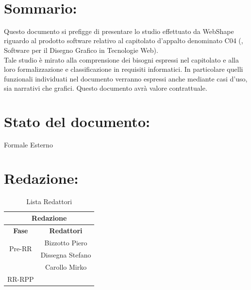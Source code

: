 \newpage


\begin{center} %
	\begin{Huge}	
				\textbf{\TITOLODOC}
			\\
	\end{Huge}
\end{center}
\parindent=18pt %
\section*{\LARGE Sommario:} %
Questo documento si prefigge di presentare lo studio effettuato da WebShape riguardo al prodotto software relativo al capitolato d'appalto denominato C04 (\blue{\ajax}, Software per il Disegno Grafico in Tecnologie Web).\\
Tale studio \`e mirato alla comprensione dei bisogni espressi nel capitolato e alla loro formalizzazione e classificazione in requisiti informatici. In particolare quelli funzionali individuati nel documento verranno espressi anche mediante casi d'uso, sia narrativi che grafici. Questo documento avr\`a valore contrattuale.

\section*{\LARGE Stato del documento:}
	Formale Esterno
\hangindent=0pt

\section*{\LARGE Redazione:}
	\begin{table}[!h]
		\begin{center}
			\begin{tabular}
				{|c|c|}
				\hline
				\multicolumn{2}{|c|}{ \textbf{Redazione} } \\
				\hline
				\textbf{Fase} & \textbf{Redattori} \\
				\hline
				\multirow{2}{*}{Pre-RR} & Bizzotto Piero\\
										& Dissegna Stefano\\
										& Carollo Mirko\\
				\hline
				\multirow{2}{*}{RR-RPP} & \\
										& \\
				\hline
			\end{tabular}
			\caption{Lista Redattori} %
			\label{tabredazione}
		\end{center}
	\end{table}	

